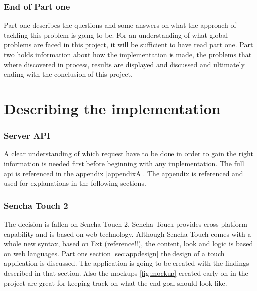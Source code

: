 
\section*{End of Part one}
Part one describes the questions and some answers on what the approach of tackling this problem is going to be. For an understanding of what global problems are faced in this project, it will be sufficient to have read part one. Part two holds information about how the implementation is made, the problems that where discovered in process, results are displayed and discussed and ultimately ending with the conclusion of this project. 

\part{Describing the implementation}

\section{Server API}
A clear understanding of which request have to be done in order to gain the right information is needed first before beginning with any implementation. The full api is referenced in the appendix \ref{appendixA}. The appendix is referenced and used for explanations in the following sections.

\section{Sencha Touch 2}
The decision is fallen on Sencha Touch 2. Sencha Touch provides cross-platform capability and is based on web technology. Although Sencha Touch comes with a whole new syntax, based on Ext (reference!!), the content, look and logic is based on web languages.
Part one section \ref{sec:appdesign} the design of a touch application is discussed. The application is going to be created with the findings described in that section. Also the mockups \ref{fig:mockup} created early on in the project are great for keeping track on what the end goal should look like. 

